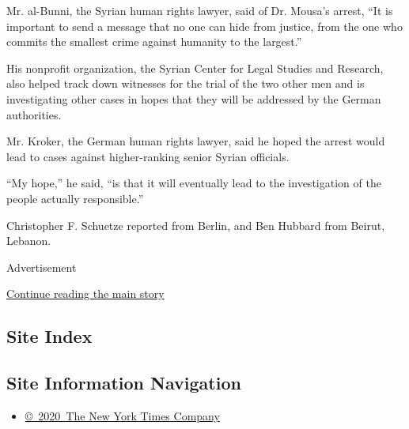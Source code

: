 Mr. al-Bunni, the Syrian human rights lawyer, said of Dr. Mousa's
arrest, ``It is important to send a message that no one can hide from
justice, from the one who commits the smallest crime against humanity to
the largest.''

His nonprofit organization, the Syrian Center for Legal Studies and
Research, also helped track down witnesses for the trial of the two
other men and is investigating other cases in hopes that they will be
addressed by the German authorities.

Mr. Kroker, the German human rights lawyer, said he hoped the arrest
would lead to cases against higher-ranking senior Syrian officials.

``My hope,'' he said, ``is that it will eventually lead to the
investigation of the people actually responsible.''

Christopher F. Schuetze reported from Berlin, and Ben Hubbard from
Beirut, Lebanon.

Advertisement

\protect\hyperlink{after-bottom}{Continue reading the main story}

\hypertarget{site-index}{%
\subsection{Site Index}\label{site-index}}

\hypertarget{site-information-navigation}{%
\subsection{Site Information
Navigation}\label{site-information-navigation}}

\begin{itemize}
\tightlist
\item
  \href{https://help.nytimes.com/hc/en-us/articles/115014792127-Copyright-notice}{©~2020~The
  New York Times Company}
\end{itemize}

